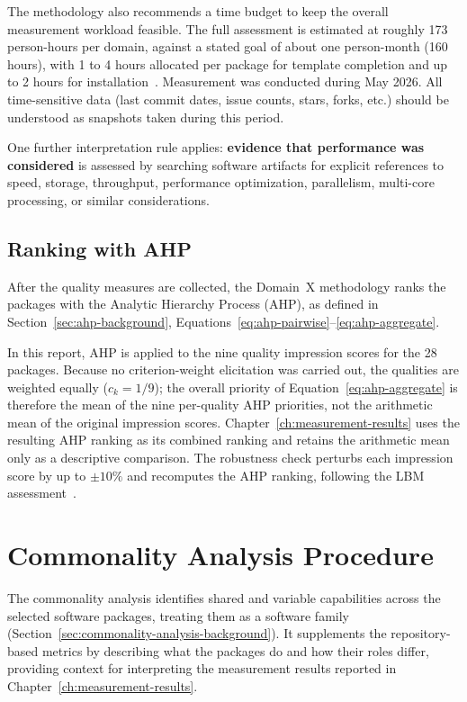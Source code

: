The methodology also recommends a time budget to keep the overall measurement workload feasible. The full assessment is estimated at roughly 173 person-hours per domain, against a stated goal of about one person-month (160 hours), with 1 to 4 hours allocated per package for template completion and up to 2 hours for installation~\citep{Smith2021}. Measurement was conducted during May 2026. All time-sensitive data (last commit dates, issue counts, stars, forks, etc.) should be understood as snapshots taken during this period.

One further interpretation rule applies: \textbf{evidence that performance was considered} is assessed by searching software artifacts for explicit references to speed, storage, throughput, performance optimization, parallelism, multi-core processing, or similar considerations.

\subsection{Ranking with AHP}
\label{subsec:ahp-ranking}

After the quality measures are collected, the Domain~X methodology ranks the packages with the Analytic Hierarchy Process (AHP), as defined in Section~\ref{sec:ahp-background}, Equations~\eqref{eq:ahp-pairwise}--\eqref{eq:ahp-aggregate}.

In this report, AHP is applied to the nine quality impression scores for the 28 packages. Because no criterion-weight elicitation was carried out, the qualities are weighted equally ($c_k = 1/9$); the overall priority of Equation~\eqref{eq:ahp-aggregate} is therefore the mean of the nine per-quality AHP priorities, not the arithmetic mean of the original impression scores. Chapter~\ref{ch:measurement-results} uses the resulting AHP ranking as its combined ranking and retains the arithmetic mean only as a descriptive comparison. The robustness check perturbs each impression score by up to $\pm 10\%$ and recomputes the AHP ranking, following the LBM assessment~\citep{Smith2024LBM}.

\section{Commonality Analysis Procedure}
\label{sec:commonality-analysis-procedure}

The commonality analysis identifies shared and variable capabilities across the selected software packages, treating them as a software family (Section~\ref{sec:commonality-analysis-background}). It supplements the repository-based metrics by describing what the packages do and how their roles differ, providing context for interpreting the measurement results reported in Chapter~\ref{ch:measurement-results}.

